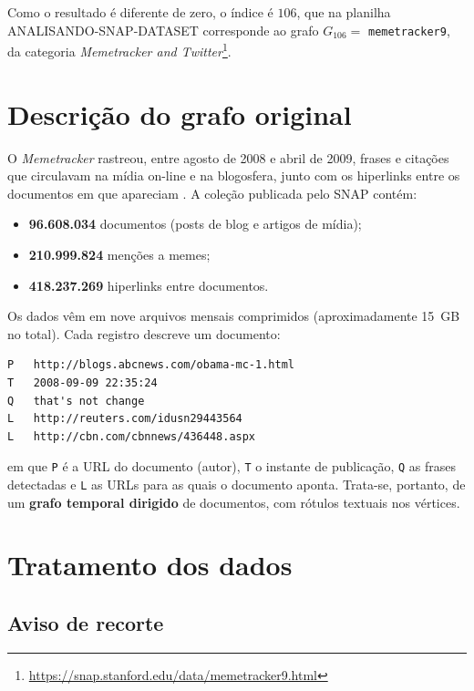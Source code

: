 \documentclass[sigconf]{webmedia}
\begin{document}
Como o resultado é diferente de zero, o índice é $106$, que na planilha
\textsc{ANALISANDO-SNAP-DATASET} corresponde ao grafo
$G_{106} = $ \texttt{memetracker9}, da categoria \textit{Memetracker and
Twitter}\footnote{\url{https://snap.stanford.edu/data/memetracker9.html}}.

\section{Descrição do grafo original}

O \textit{Memetracker} rastreou, entre agosto de 2008 e abril de 2009,
frases e citações que circulavam na mídia on-line e na blogosfera, junto
com os hiperlinks entre os documentos em que apareciam
\cite{leskovec2009}. A coleção publicada pelo SNAP contém:

\begin{itemize}[nosep]
  \item \textbf{96.608.034} documentos (posts de blog e artigos de mídia);
  \item \textbf{210.999.824} menções a memes;
  \item \textbf{418.237.269} hiperlinks entre documentos.
\end{itemize}

Os dados vêm em nove arquivos mensais comprimidos (aproximadamente 15~GB
no total). Cada registro descreve um documento:

\begin{verbatim}
P   http://blogs.abcnews.com/obama-mc-1.html
T   2008-09-09 22:35:24
Q   that's not change
L   http://reuters.com/idusn29443564
L   http://cbn.com/cbnnews/436448.aspx
\end{verbatim}

\noindent
em que \texttt{P} é a URL do documento (autor), \texttt{T} o instante de
publicação, \texttt{Q} as frases detectadas e \texttt{L} as URLs para as
quais o documento aponta. Trata-se, portanto, de um \textbf{grafo temporal
dirigido} de documentos, com rótulos textuais nos vértices.

\section{Tratamento dos dados}
\label{sec:tratamento}

\subsection*{Aviso de recorte}
\end{document}

